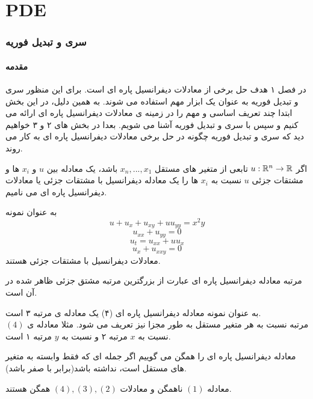 \part{PDE}
\section{سری و تبدیل فوریه}
\subsection*{مقدمه}
در فصل ۱ هدف حل برخی از معادلات دیفرانسیل پاره ای است. برای این منظور سری و تبدیل فوریه به عنوان یک ابزار مهم استفاده می شوند. به همین دلیل، در این بخش ابتدا چند تعریف اساسی و مهم را در زمینه ی معادلات دیفرانسیل پاره ای ارائه می کنیم و سپس با سری و تبدیل فوریه آشنا می شویم. بعدا در بخش های ۲ و ۳ خواهیم دید که سری و تبدیل فوریه چگونه در حل برخی معادلات دیفرانسیل پاره ای به کار می روند.\\
\begin{definition}
 اگر 
$u:\mathbb{R}^n \to \mathbb{R}$
تابعی از متغیر های مستقل
$x_n,...,x_1$
باشد، یک معادله بین 
$u$
و 
$x_i$
 ها و مشتقات جزئی
 $u$
 نسبت به
 $x_i$
 ها را یک معادله دیفرانسیل با مشتقات جزئی یا معادلات دیفرانسیل پاره ای می نامیم.\\
\end{definition}
 به عنوان نمونه
 \begin{equation}
u+u_x+u_{xy}+uu_{yy}=x^2y
\end{equation}
\begin{equation}
u_{xx}+u_{yy}=0
\end{equation}
\begin{equation}
u_t=u_{xx}+uu_x
\end{equation}
\begin{equation}
u_x+u_{xxy}=0
\end{equation}
معادلات دیفرانسیل با مشتقات جزئی هستند.\\
\begin{definition}
 مرتبه معادله دیفرانسیل پاره ای عبارت از بزرگترین مرتبه مشتق جزئی ظاهر شده در آن است.
\end{definition}
  به عنوان نمونه معادله دیفرانسیل پاره ای (۴) یک معادله ی مرتبه ۳ است.\\
مرتبه نسبت به هر متغیر مستقل به طور مجزا نیز تعریف می شود. مثلا معادله ی 
$(4)$
 نسبت به 
$x$
مرتبه ۲ و نسبت به 
$y$
مرتبه ۱ است.\\

\begin{definition}
معادله دیفرانسیل پاره ای را همگن می گوییم اگر جمله ای که فقط وابسته به متغیر های مستقل است، نداشته باشد(برابر با صفر باشد).\\
\end{definition}
معادله
$(1)$
  ناهمگن و معادلات
$(4),(3),(2)$
 همگن هستند.\\
 
